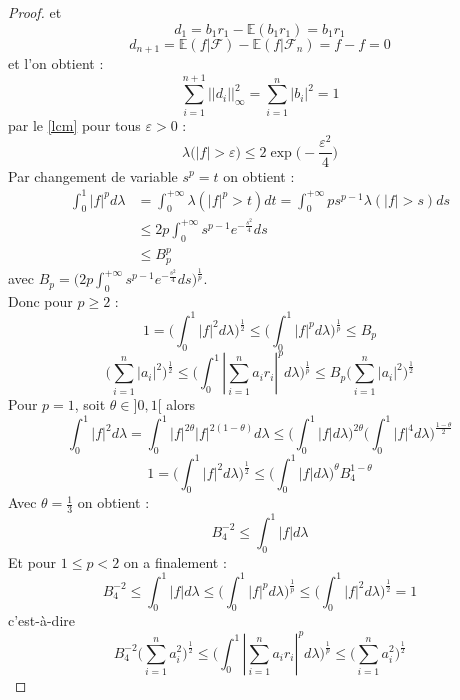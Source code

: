 \documentclass[12pt]{article}
\theoremstyle{definition}
\begin{document}
\begin{proof}
	et 
	\begin{equation*}
		d_1 = b_1r_1 - \mathbb{E}(b_1r_1)=b_1r_1
	\end{equation*}
	\begin{equation*}
		d_{n+1} = \mathbb{E}(f|\mathcal{F})-\mathbb{E}(f|\mathcal{F}_n)= f-f=0
	\end{equation*}
	et l'on obtient :
	\begin{equation*}
	\sum_{i=1}^{n+1}||d_i||^2_\infty = \sum_{i=1}^{n}|b_i|^2=1
	\end{equation*}
	par le \cref{lcm} pour tous $\varepsilon>0$ :
	\begin{equation*}
		\lambda\big(|f|>\varepsilon\big)\leq 2 \exp\big(-\frac{\varepsilon^2}{4}\big)
	\end{equation*}
	Par changement de variable $s^p=t$ on obtient :
	\begin{align*}
		\int_{0}^{1}|f|^p d\lambda &= \int_{0}^{+\infty}\lambda(|f|^p>t)dt = \int_{0}^{+\infty}p s^{p-1}\lambda(|f|>s)ds \\
		&\leq 2p\int_{0}^{+\infty}s^{p-1}e^{-\frac{s^2}{4}}ds\\
		&\leq B_p^p
	\end{align*}
	avec $B_p= \big(2p\int_{0}^{+\infty}s^{p-1}e^{-\frac{s^2}{4}}ds\big)^{\frac{1}{p}}$.\\
	Donc pour $p\geq 2$ : 
	\begin{equation*}
		1 =\big(\int_{0}^{1}|f|^2d\lambda\big)^{\frac{1}{2}}\leq \big(\int_{0}^{1}|f|^pd\lambda\big)^{\frac{1}{p}}\leq B_p
	\end{equation*}
	\begin{equation*}
		\big(\sum_{i=1}^{n}|a_i|^2\big)^{\frac{1}{2}} \leq \big(\int_{0}^{1}|\sum_{i=1}^{n}a_ir_i|^pd\lambda\big)^{\frac{1}{p}}\leq B_p\big(\sum_{i=1}^{n}|a_i|^2\big)^{\frac{1}{2}} 
	\end{equation*}
	Pour $p=1$, soit $\theta\in]0,1[$ alors 
	\begin{equation*}
		\int_{0}^{1}|f|^{2}d\lambda=\int_{0}^{1}|f|^{2\theta}|f|^{2(1-\theta)}d\lambda\leq\Bigg(\int_{0}^1 |f| d\lambda\Bigg)^{2\theta}\Bigg(\int_{0}^1|f|^{4}d\lambda\Bigg)^{\frac{1-\theta}{2}}
	\end{equation*}
	\begin{equation*}
		1 = \Bigg(\int_{0}^{1}|f|^{2}d\lambda\Bigg)^{\frac{1}{2}}\leq \Bigg(\int_{0}^1 |f| d\lambda\Bigg)^{\theta}B_4^{1-\theta}
	\end{equation*}
	Avec $\theta=\frac{1}{3}$ on obtient :
	\begin{equation*}
		B_4^{-2} \leq \int_{0}^1 |f| d\lambda
	\end{equation*}
	Et pour $1\leq p <2 $ on a finalement :
	\begin{equation*}
		B_4^{-2}\leq \int_{0}^1 |f| d\lambda \leq \Big(\int_0^1|f|^pd\lambda \Big)^{\frac{1}{p}}\leq \Big(\int_{0}^{1}|f|^{2}d\lambda\Big)^{\frac{1}{2}}=1
	\end{equation*}
	c'est-à-dire 
	\begin{equation*}
		B_4^{-2}\big(\sum_{i=1}^{n}a_i^2\big)^{\frac{1}{2}}\leq \Big(\int_0^1|\sum_{i=1}^{n}a_ir_i|^pd\lambda \Big)^{\frac{1}{p}}\leq \big(\sum_{i=1}^{n}a_i^2\big)^{\frac{1}{2}}
	\end{equation*}
	\end{proof}	

\newpage
\nocite{GP}
\nocite{VM2}
\nocite{VMGS}
\printbibliography
\end{document}
